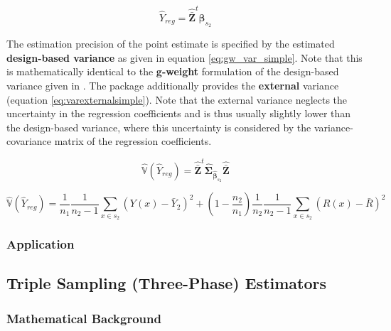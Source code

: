 \documentclass[article]{jss}
\newcommand{\var}{\mathbb{V}}
\begin{document}
\begin{equation}\label{eq:pointest_simple}
\hat{Y}_{reg}=\hat{\bar{\pmb{Z}}}^t\hat{\pmb{\beta}}_{s_2}
\end{equation}

The estimation precision of the point estimate is specified by the estimated \textbf{design-based variance} as given in equation \ref{eq:gw_var_simple}. Note that this is mathematically identical to the \textbf{g-weight} formulation of the design-based variance given in \citep{mandallaz2016}. The package  additionally provides the \textbf{external} variance (equation \ref{eq:varexternalsimple}). Note that the external variance neglects the uncertainty in the regression coefficients and is thus usually slightly lower than the design-based variance, where this uncertainty is considered by the variance-covariance matrix of the regression coefficients.

\begin{equation}\label{eq:gw_var_simple}
\hat{\var}(\hat{Y}_{reg})=\hat{\bar{\pmb{Z}}}^t\hat{\pmb{\Sigma}}_{\hat{\pmb{\beta}}_{s_2}}\hat{\bar{\pmb{Z}}}
\end{equation}


\begin{equation}\label{eq:varexternalsimple}
\hat{\var}(\hat{Y}_{reg})=
\frac{1}{n_1}\frac{1}{n_2-1}\sum_{x\in{s_2}}(Y(x)-\bar{Y}_2)^2+
(1-\frac{n_2}{n_1})\frac{1}{n_2}\frac{1}{n_2-1}\sum_{x\in{s_2}}(R(x)-\bar{R})^2
\end{equation}




\subsubsection{Application}





















\subsection{Triple Sampling (Three-Phase) Estimators}


\subsubsection{Mathematical Background}
\end{document}
